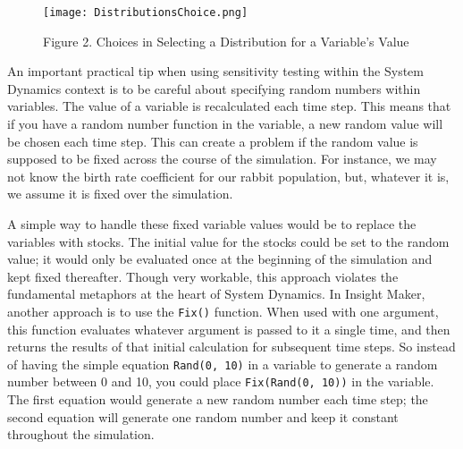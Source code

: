 \documentclass[]{memoir}
\let\Oldincludegraphics\includegraphics
\renewcommand{\includegraphics}[1]{\Oldincludegraphics[max size={\textwidth}{\textheight}]{#1}}
\begin{document}
\begin{figure}[htbp]
\centering
\texttt{[image: DistributionsChoice.png]}
\caption{Figure 2. Choices in Selecting a Distribution for a Variable's
Value}
\end{figure}

An important practical tip when using sensitivity testing within the
System Dynamics context is to be careful about specifying random numbers
within variables. The value of a variable is recalculated each time
step. This means that if you have a random number function in the
variable, a new random value will be chosen each time step. This can
create a problem if the random value is supposed to be fixed across the
course of the simulation. For instance, we may not know the birth rate
coefficient for our rabbit population, but, whatever it is, we assume it
is fixed over the simulation.

A simple way to handle these fixed variable values would be to replace
the variables with stocks. The initial value for the stocks could be set
to the random value; it would only be evaluated once at the beginning of
the simulation and kept fixed thereafter. Though very workable, this
approach violates the fundamental metaphors at the heart of System
Dynamics. In Insight Maker, another approach is to use the
\lstinline!Fix()! function. When used with one argument, this function
evaluates whatever argument is passed to it a single time, and then
returns the results of that initial calculation for subsequent time
steps. So instead of having the simple equation \lstinline!Rand(0, 10)!
in a variable to generate a random number between 0 and 10, you could
place \lstinline!Fix(Rand(0, 10))! in the variable. The first equation
would generate a new random number each time step; the second equation
will generate one random number and keep it constant throughout the
simulation.

\FloatBarrier 
\end{document}
